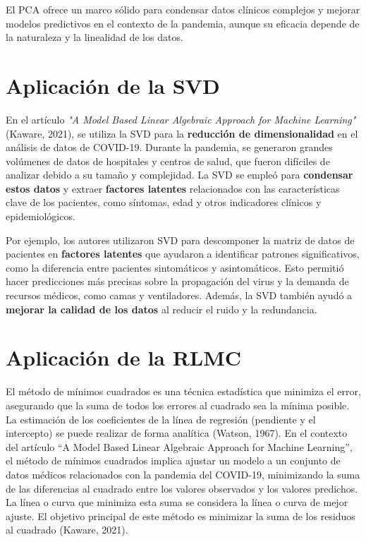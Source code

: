 \documentclass[12pt]{article}
\begin{document}
        \vspace{1em}
        \noindent
        El PCA ofrece un marco sólido para condensar datos clínicos complejos y mejorar modelos predictivos en el contexto de la pandemia, aunque su eficacia depende de la naturaleza y la linealidad de los datos.
        
        \section*{Aplicación de la SVD}
        \noindent
        En el artículo \textit{"A Model Based Linear Algebraic Approach for Machine Learning"} (Kaware, 2021), se utiliza la SVD para la \textbf{reducción de dimensionalidad} en el análisis de datos de COVID-19. Durante la pandemia, se generaron grandes volúmenes de datos de hospitales y centros de salud, que fueron difíciles de analizar debido a su tamaño y complejidad. La SVD se empleó para \textbf{condensar estos datos} y extraer \textbf{factores latentes} relacionados con las características clave de los pacientes, como síntomas, edad y otros indicadores clínicos y epidemiológicos.
        
        Por ejemplo, los autores utilizaron SVD para descomponer la matriz de datos de pacientes en \textbf{factores latentes} que ayudaron a identificar patrones significativos, como la diferencia entre pacientes sintomáticos y asintomáticos. Esto permitió hacer predicciones más precisas sobre la propagación del virus y la demanda de recursos médicos, como camas y ventiladores. Además, la SVD también ayudó a \textbf{mejorar la calidad de los datos} al reducir el ruido y la redundancia.
        
        \section*{Aplicación de la RLMC}
        \noindent
        El método de mínimos cuadrados es una técnica estadística que minimiza el error, asegurando que la suma de todos los errores al cuadrado sea la mínima posible. La estimación de los coeficientes de la línea de regresión (pendiente y el intercepto) se puede realizar de forma analítica (Watson, 1967). En el contexto del artículo “A Model Based Linear Algebraic Approach for Machine Learning”, el método de mínimos cuadrados implica ajustar un modelo a un conjunto de datos médicos relacionados con la pandemia del COVID-19, minimizando la suma de las diferencias al cuadrado entre los valores observados y los valores predichos. La línea o curva que minimiza esta suma se considera la línea o curva de mejor ajuste. El objetivo principal de este método es minimizar la suma de los residuos al cuadrado (Kaware, 2021).
        
\end{document}

